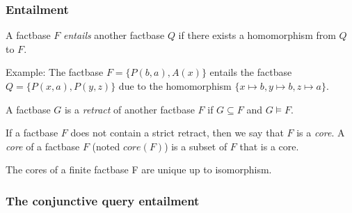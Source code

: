 \documentclass{beamer}
\begin{document}
\begin{frame}
\frametitle{Entailment}

A factbase $F$ \emph{entails} another factbase $Q$ if there exists a homomorphism from $Q$ to $F$.

Example: The factbase $F = \{P(b,a),A(x)\}$ entails the factbase $Q = \{P(x,a),P(y,z)\}$ due to the homomorphism $\{x \mapsto b, y \mapsto b, z \mapsto a \}$.

A factbase $G$ is a \emph{retract} of another factbase $F$ if $G \subseteq F$ and $G \models F$.


If a factbase $F$ does not contain a strict retract, then we say that $F$ is a \emph{core}. A \emph{core} of a factbase $F$ (noted \emph{$\textit{core}(F)$}) is a subset of $F$ that is a core.

The cores of a finite factbase F are unique up to isomorphism.


\end{frame}

\begin{frame}
\frametitle{The conjunctive query entailment}

\end{frame}
\end{document}
